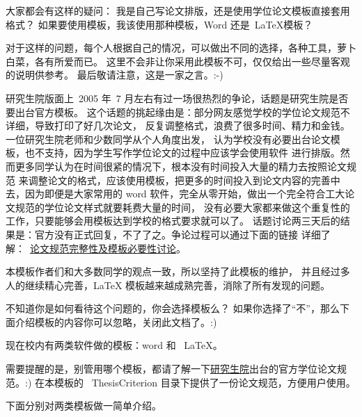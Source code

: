 
\label{Tricks}

\label{tricks:abouttemplates}

大家都会有这样的疑问：
我是自己写论文排版，还是使用学位论文模板直接套用格式？
如果要使用模板，我该使用那种模板，Word 还是~\LaTeX 模板？

对于这样的问题，每个人根据自己的情况，可以做出不同的选择，各种工具，萝卜白菜，各有所爱而已。
这里不会非让你采用此模板不可，仅仅给出一些尽量客观的说明供参考。
最后敬请注意，这是一家之言。:-)

\label{tricks:necessaryornot}

研究生院版面上~2005 年~7 月左右有过一场很热烈的争论，话题是研究生院是否要出台官方模板。
这个话题的挑起缘由是：部分网友感觉学校的学位论文规范不详细，导致打印了好几次论文，
反复调整格式，浪费了很多时间、精力和金钱。一位研究生院老师和少数同学从个人角度出发，
认为学校没有必要出台论文模板，也不支持，因为学生写作学位论文的过程中应该学会使用软件
进行排版。然而更多同学认为在时间很紧的情况下，根本没有时间投入大量的精力去按照论文规范
来调整论文的格式，应该使用模板，把更多的时间投入到论文内容的完善中去，因为即便是大家常用的 word 软件，完全从零开始，做出一个完全符合工大论文规范的学位论文样式就要耗费大量的时间，
没有必要大家都来做这个重复性的工作，只要能够会用模板达到学校的格式要求就可以了。
话题讨论两三天后的结果是：官方没有正式回复，不了了之。争论过程可以通过下面的链接
详细了解：~\href{http://bbs.hit.edu.cn/cgi-bin/bbs/bbs0an?path=\%2Fgroups\%2FGROUP\%5F6\%2FTeX\%2Ftex05\%2Fabout}{论文规范完整性及模板必要性讨论}。

本模板作者们和大多数同学的观点一致，所以坚持了此模板的维护，
并且经过多人的继续精心完善，LaTeX 模板越来越成熟完善，消除了所有发现的问题。

不知道你是如何看待这个问题的，你会选择模板么？ 如果你选择了``不''，那么下面介绍模板的内容你可以忽略，关闭此文档了。:)

现在校内有两类软件做的模板：word 和~ LaTeX。

需要提醒的是，别管用哪个模板，都请了解一下\href{http://hitgs.hit.edu.cn/}{研究生院}出台的官方学位论文规范。:)
在本模板的~ ThesisCriterion 目录下提供了一份论文规范，方便用户使用。

下面分别对两类模板做一简单介绍。

